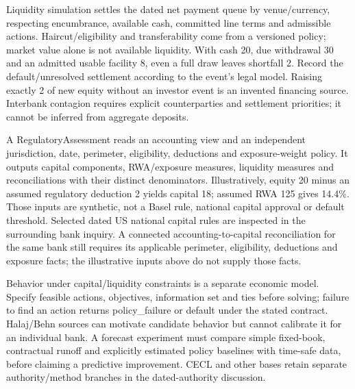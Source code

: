 Liquidity simulation settles the dated net payment queue by venue/currency, respecting encumbrance, available cash, committed line terms and admissible actions. Haircut/eligibility and transferability come from a versioned policy; market value alone is not available liquidity. With cash 20, due withdrawal 30 and an admitted usable facility 8, even a full draw leaves shortfall 2. Record the default/unresolved settlement according to the event's legal model. Raising exactly 2 of new equity without an investor event is an invented financing source. Interbank contagion requires explicit counterparties and settlement priorities; it cannot be inferred from aggregate deposits.



A RegulatoryAssessment reads an accounting view and an independent jurisdiction, date, perimeter, eligibility, deductions and exposure-weight policy. It outputs capital components, RWA/exposure measures, liquidity measures and reconciliations with their distinct denominators. Illustratively, equity 20 minus an assumed regulatory deduction 2 yields capital 18; assumed RWA 125 gives 14.4\%. Those inputs are synthetic, not a Basel rule, national capital approval or default threshold. Selected dated US national capital rules are inspected in the surrounding bank inquiry. A connected accounting-to-capital reconciliation for the same bank still requires its applicable perimeter, eligibility, deductions and exposure facts; the illustrative inputs above do not supply those facts.

Behavior under capital/liquidity constraints is a separate economic model. Specify feasible actions, objectives, information set and ties before solving; failure to find an action returns policy\_failure or default under the stated contract. Halaj/Behn sources can motivate candidate behavior but cannot calibrate it for an individual bank. A forecast experiment must compare simple fixed-book, contractual runoff and explicitly estimated policy baselines with time-safe data, before claiming a predictive improvement. CECL and other bases retain separate authority/method branches in the dated-authority discussion.
